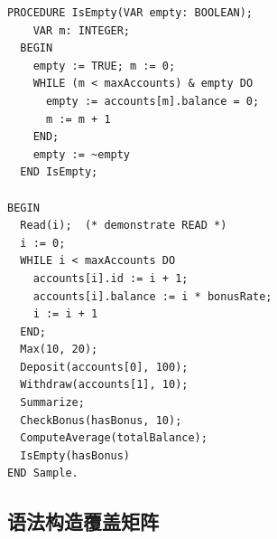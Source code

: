 \documentclass[12pt,a4paper,fontset=none]{ctexart}
\begin{document}
\begin{lstlisting}[style=oberoncode,caption={Sample.obr — 覆盖全部语法构造的正确 Oberon-0 程序}]
  PROCEDURE IsEmpty(VAR empty: BOOLEAN);
    VAR m: INTEGER;
  BEGIN
    empty := TRUE; m := 0;
    WHILE (m < maxAccounts) & empty DO
      empty := accounts[m].balance = 0;
      m := m + 1
    END;
    empty := ~empty
  END IsEmpty;

BEGIN
  Read(i);  (* demonstrate READ *)
  i := 0;
  WHILE i < maxAccounts DO
    accounts[i].id := i + 1;
    accounts[i].balance := i * bonusRate;
    i := i + 1
  END;
  Max(10, 20);
  Deposit(accounts[0], 100);
  Withdraw(accounts[1], 10);
  Summarize;
  CheckBonus(hasBonus, 10);
  ComputeAverage(totalBalance);
  IsEmpty(hasBonus)
END Sample.
\end{lstlisting}

\subsection{语法构造覆盖矩阵}
\end{document}
